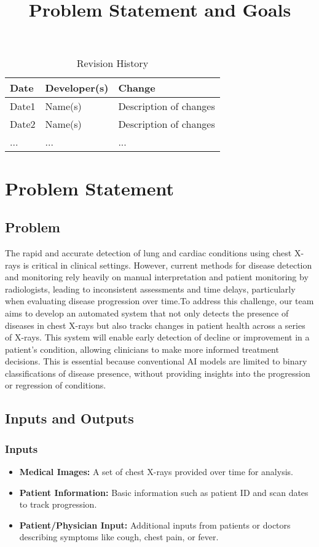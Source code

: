 \documentclass{article}
\title{Problem Statement and Goals\\\progname}
\author{\authname}
\date{}
\begin{document}
\maketitle

\begin{table}[hp]
\caption{Revision History} \label{TblRevisionHistory}
\begin{tabularx}{\textwidth}{llX}
\toprule
\textbf{Date} & \textbf{Developer(s)} & \textbf{Change}\\
\midrule
Date1 & Name(s) & Description of changes\\
Date2 & Name(s) & Description of changes\\
... & ... & ...\\
\bottomrule
\end{tabularx}
\end{table}
\newpage
\section{Problem Statement}
\subsection{Problem}
The rapid and accurate detection of lung and cardiac conditions using chest X-rays is critical in clinical settings. However, current methods for disease detection and monitoring rely heavily on manual interpretation and patient monitoring by radiologists, leading to inconsistent assessments and time delays, particularly when evaluating disease progression over time.To address this challenge, our team aims to develop an automated system that not only detects the presence of diseases in chest X-rays but also tracks changes in patient health across a series of X-rays. This system will enable early detection of decline or improvement in a patient's condition, allowing clinicians to make more informed treatment decisions. This is essential because conventional AI models are limited to binary classifications of disease presence, without providing insights into the progression or regression of conditions.
\subsection{Inputs and Outputs}
\subsubsection{Inputs}

\begin{itemize}
    \item \textbf{Medical Images:} A set of chest X-rays provided over time for analysis.
    \item \textbf{Patient Information:} Basic information such as patient ID and scan dates to track progression.
    \item \textbf{Patient/Physician Input:} Additional inputs from patients or doctors describing symptoms like cough, chest pain, or fever.
\end{itemize}
\end{document}
